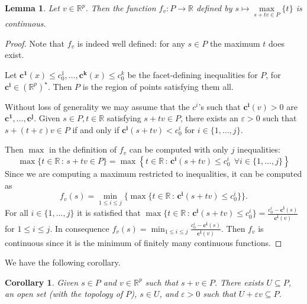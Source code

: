 \documentclass[10pt,a4paper]{article}
\newcommand{\RR}{\mathbb{R}}
\newcommand{\eps}{\varepsilon}
\theoremstyle{plain}
\newtheorem{lemma}{Lemma}
\newtheorem{corollary}{Corollary}
\theoremstyle{remark}
\theoremstyle{definition}
\begin{document}
\begin{lemma} \label{lem:lemazo}
 Let $v\in \RR^p$. Then the function $f_v: P\rightarrow \RR$ defined by $s\mapsto \max\limits_{s + tv\in P} \{ t \}$ is continuous. 
\end{lemma}
\begin{proof} 
	Note that $f_v$ is indeed well defined: for any $s\in P$ the maximum $t$ does exist.%
	\par
	Let $\bm{c^1}(x)\leq c^1_0,\dots, \bm{c^k}(x)\leq c^k_0$ be the facet-defining inequalities for $P$,
	for $\bm{c^i}\in(\RR^p)^\star$.
	Then $P$ is the region of points satisfying them all. \par
	Without loss of generality we may assume that the $c^i$'s such that
	$\bm{c^i}(v)>0$ are $\bm{c^1},\dots, \bm{c^j}$.
	Given $s\in P, t\in \RR$ satisfying $s + tv \in P$, 
	there exists an $\eps > 0$ such that 
	$s + (t+ \eps)v\in P$ 
	if and only if 
	$\bm{c^i}(s+tv) < c^i_0$ 
	for $i\in \{1,\dots, j\}$.\par %
	Then $\max$ in the definition of $f_v$ can be computed with
	only $j$ inequalities:
	\[ 
	\max \{t\in \RR \, : \, s + tv\in P\} =
	\max \left\{ t \in \RR \, : \, \bm{c^i}(s+tv) \leq c^i_0 \ \ \forall i \in \{1,\dots, j\}\right\} 
	\]
	Since we are computing a maximum restricted to inequalities,
	it can be computed as
	\[
	f_v(s) = \min_{1\leq i \leq j} 
	\Big\{\max \{ t \in \RR \, : \, \bm{c^i}(s+tv)\leq c^i_0\}\Big\}.
	\]
	For all $i\in\{1,\dots,j\}$
	it is satisfied that 
	$\max \{ t \in \RR \, : \, \bm{c^i}(s+tv)\leq c^i_0\} =
	\frac{c^i_0-\bm{c^i}(s)}{\bm{c^i}(v)}$ for $1\leq i \leq j$. 
	In consequence 
	$f_v(s)=\min_{1\leq i \leq j} \frac{c^i_0-\bm{c^i}(s)}{\bm{c^i}(v)}$.
	Then $f_v$ is continuous since it is the minimum of
	finitely many continuous functions.
\end{proof}

We have the following corollary.

\begin{corollary}
	\label{lem:lemilla}
	Given $s\in  {P}$ and $v\in\RR^p$ such that $s+v\in   P$.
	There exists $U\subseteq   P$, 
	an open set (with the topology of $  P$), $s\in U$,
	and $\eps > 0$ such that $U+\eps v \subseteq   P$.
\end{corollary}
\end{document}
